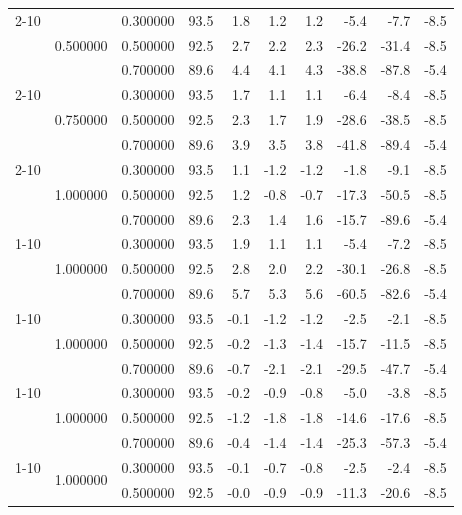 \begin{tabular}{lllrrrrrrr}
\cline{2-10}
 & \multirow[t]{3}{*}{0.500000} & 0.300000 & 93.5 & 1.8 & 1.2 & 1.2 & -5.4 & -7.7 & -8.5 \\
 &  & 0.500000 & 92.5 & 2.7 & 2.2 & 2.3 & -26.2 & -31.4 & -8.5 \\
 &  & 0.700000 & 89.6 & 4.4 & 4.1 & 4.3 & -38.8 & -87.8 & -5.4 \\
\cline{2-10}
 & \multirow[t]{3}{*}{0.750000} & 0.300000 & 93.5 & 1.7 & 1.1 & 1.1 & -6.4 & -8.4 & -8.5 \\
 &  & 0.500000 & 92.5 & 2.3 & 1.7 & 1.9 & -28.6 & -38.5 & -8.5 \\
 &  & 0.700000 & 89.6 & 3.9 & 3.5 & 3.8 & -41.8 & -89.4 & -5.4 \\
\cline{2-10}
 & \multirow[t]{3}{*}{1.000000} & 0.300000 & 93.5 & 1.1 & -1.2 & -1.2 & -1.8 & -9.1 & -8.5 \\
 &  & 0.500000 & 92.5 & 1.2 & -0.8 & -0.7 & -17.3 & -50.5 & -8.5 \\
 &  & 0.700000 & 89.6 & 2.3 & 1.4 & 1.6 & -15.7 & -89.6 & -5.4 \\
\cline{1-10} \cline{2-10}
\multirow[t]{3}{*}{independent} & \multirow[t]{3}{*}{1.000000} & 0.300000 & 93.5 & 1.9 & 1.1 & 1.1 & -5.4 & -7.2 & -8.5 \\
 &  & 0.500000 & 92.5 & 2.8 & 2.0 & 2.2 & -30.1 & -26.8 & -8.5 \\
 &  & 0.700000 & 89.6 & 5.7 & 5.3 & 5.6 & -60.5 & -82.6 & -5.4 \\
\cline{1-10} \cline{2-10}
\multirow[t]{3}{*}{llm:always\_wrong} & \multirow[t]{3}{*}{1.000000} & 0.300000 & 93.5 & -0.1 & -1.2 & -1.2 & -2.5 & -2.1 & -8.5 \\
 &  & 0.500000 & 92.5 & -0.2 & -1.3 & -1.4 & -15.7 & -11.5 & -8.5 \\
 &  & 0.700000 & 89.6 & -0.7 & -2.1 & -2.1 & -29.5 & -47.7 & -5.4 \\
\cline{1-10} \cline{2-10}
\multirow[t]{3}{*}{llm:rushing} & \multirow[t]{3}{*}{1.000000} & 0.300000 & 93.5 & -0.2 & -0.9 & -0.8 & -5.0 & -3.8 & -8.5 \\
 &  & 0.500000 & 92.5 & -1.2 & -1.8 & -1.8 & -14.6 & -17.6 & -8.5 \\
 &  & 0.700000 & 89.6 & -0.4 & -1.4 & -1.4 & -25.3 & -57.3 & -5.4 \\
\cline{1-10} \cline{2-10}
\multirow[t]{3}{*}{llm:semantic\_hallucination} & \multirow[t]{3}{*}{1.000000} & 0.300000 & 93.5 & -0.1 & -0.7 & -0.8 & -2.5 & -2.4 & -8.5 \\
 &  & 0.500000 & 92.5 & -0.0 & -0.9 & -0.9 & -11.3 & -20.6 & -8.5 \\

\end{tabular}
